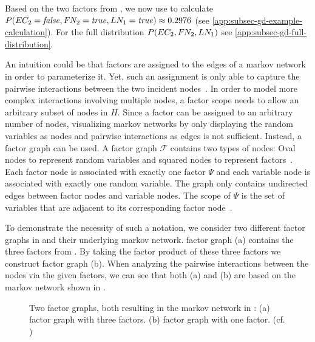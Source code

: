 Based on the two \glspl{factor} from , we now use  to calculate $P(EC_2=\mathit{false},F\hspace{-0.07em} N_2=\mathit{true},LN_1=\mathit{true})\approx 0.2976$ (see \cref{app:subsec-gd-example-calculation}).
For the full distribution $P(EC_2,F\hspace{-0.07em} N_2,LN_1)$ see \cref{app:subsec-gd-full-distribution}.

\bigskip

An intuition could be that \glspl{factor} are assigned to the edges of a \gls{markov network} in order to parameterize it.
Yet, such an assignment is only able to capture the pairwise interactions between the two incident nodes~\citep{koller2009probabilistic}.
In order to model more complex interactions involving multiple nodes, a \gls{factor scope} needs to allow an arbitrary subset of nodes in $H$.
Since a factor can be assigned to an arbitrary number of nodes, visualizing \glspl{markov network} by only displaying the random variables as nodes and pairwise interactions as edges is not sufficient.
Instead, a \gls{factor graph} can be used.
A \gls{factor graph} $\mathcal{F}$ contains two types of \glspl{node}: Oval \glspl{node} to represent \glspl{random variable} and squared \glspl{node} to represent \glspl{factor}~\citep{koller2009probabilistic}.
Each factor node is associated with exactly one \gls{factor} $\Psi$ and each variable node is associated with exactly one \gls{random variable}.
The graph only contains undirected edges between factor nodes and variable nodes.
The scope of $\Psi$ is the set of variables that are adjacent to its corresponding factor node~\citep{koller2009probabilistic}.

To demonstrate the necessity of such a notation, we consider two different \glspl{factor graph} in  and their underlying \gls{markov network}.
\Gls{factor graph} (a) contains the three factors from .
By taking the \gls{factor product} of these three \glspl{factor} we construct \gls{factor graph} (b).
When analyzing the pairwise interactions between the nodes via the given \glspl{factor}, we can see that both (a) and (b) are based on the \gls{markov network} shown in  .

\begin{figure}[t]
\centering
  
\caption[Two factor graphs resulting in the same Markov network]{%
  Two \glspl{factor graph}, both resulting in the \gls{markov network} in :
  (a) \Gls{factor graph} with three \glspl{factor}.
  (b) \Gls{factor graph} with one \gls{factor}.
  (cf. \citep{koller2009probabilistic})
}
\label{fig:example-factor-graphs}
\end{figure}

